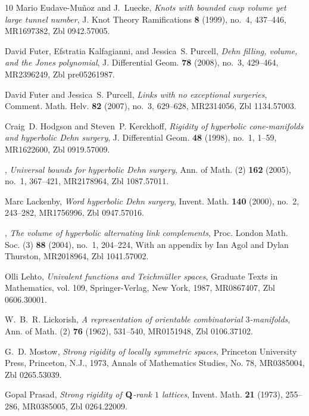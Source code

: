 \documentclass[11pt]{amsart}
\theoremstyle{plain}
\theoremstyle{definition}
\begin{document}
\begin{thebibliography}{10}
Mario Eudave-Mu{\~n}oz and J.~Luecke, \emph{Knots with bounded cusp volume yet
  large tunnel number}, J. Knot Theory Ramifications \textbf{8} (1999), no.~4,
  437--446, MR1697382, Zbl 0942.57005.

David Futer, Efstratia Kalfagianni, and Jessica~S. Purcell,
\emph{{Dehn filling, volume, and the Jones polynomial}},
J. Differential Geom. \textbf{78} (2008), no.~3, 429--464, MR2396249,
Zbl pre05261987. 

David Futer and Jessica~S. Purcell, \emph{{Links with no exceptional
  surgeries}}, Comment. Math. Helv. \textbf{82} (2007), no.~3,
629--628, MR2314056, Zbl 1134.57003.

Craig~D. Hodgson and Steven~P. Kerckhoff, \emph{Rigidity of hyperbolic
  cone-manifolds and hyperbolic {D}ehn surgery}, J. Differential Geom.
  \textbf{48} (1998), no.~1, 1--59, MR1622600, Zbl 0919.57009.

\bysame, \emph{Universal bounds for hyperbolic {D}ehn surgery}, Ann. of Math.
  (2) \textbf{162} (2005), no.~1, 367--421, MR2178964, Zbl 1087.57011.

Marc Lackenby, \emph{Word hyperbolic {D}ehn surgery}, Invent. Math.
  \textbf{140} (2000), no.~2, 243--282, MR1756996, Zbl 0947.57016.

\bysame, \emph{The volume of hyperbolic alternating link complements}, Proc.
  London Math. Soc. (3) \textbf{88} (2004), no.~1, 204--224, With an appendix
  by Ian Agol and Dylan Thurston, MR2018964, Zbl 1041.57002.

Olli Lehto, \emph{Univalent functions and {T}eichm\"uller spaces}, Graduate
  Texts in Mathematics, vol. 109, Springer-Verlag, New York, 1987,
	MR0867407, Zbl 0606.30001.

W.~B.~R. Lickorish, \emph{A representation of orientable combinatorial
  {$3$}-manifolds}, Ann. of Math. (2) \textbf{76} (1962), 531--540,
MR0151948, Zbl 0106.37102.

G.~D. Mostow, \emph{Strong rigidity of locally symmetric spaces}, Princeton
  University Press, Princeton, N.J., 1973, Annals of Mathematics Studies, No.
  78, MR0385004, Zbl 0265.53039.

Gopal Prasad, \emph{Strong rigidity of {${\bf Q}$}-rank {$1$} lattices},
  Invent. Math. \textbf{21} (1973), 255--286, MR0385005, Zbl 0264.22009.


\end{thebibliography}
\end{document}
